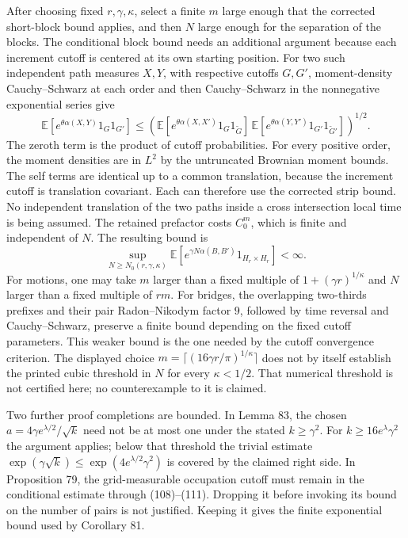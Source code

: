 \documentclass[10pt]{article}
\begin{document}
After choosing fixed \(r,\gamma,\kappa\), select a finite \(m\) large enough that the corrected short-block bound applies, and then \(N\) large enough for the separation of the blocks. The conditional block bound needs an additional argument because each increment cutoff is centered at its own starting position. For two such independent path measures \(X,Y\), with respective cutoffs \(G,G'\), moment-density Cauchy–Schwarz at each order and then Cauchy–Schwarz in the nonnegative exponential series give \[\mathbb E[e^{\theta\alpha(X,Y)}1_G1_{G'}]
 \le\left(
 \mathbb E[e^{\theta\alpha(X,X')}1_G1_{\widetilde G}]\,
 \mathbb E[e^{\theta\alpha(Y,Y')}1_{G'}1_{\widetilde G'}]
 \right)^{1/2}.\] The zeroth term is the product of cutoff probabilities. For every positive order, the moment densities are in \(L^2\) by the untruncated Brownian moment bounds. The self terms are identical up to a common translation, because the increment cutoff is translation covariant. Each can therefore use the corrected strip bound. No independent translation of the two paths inside a cross intersection local time is being assumed. The retained prefactor costs \(C_0^m\), which is finite and independent of \(N\). The resulting bound is \[\sup_{N\ge N_0(r,\gamma,\kappa)}
 \mathbb E[e^{\gamma N\alpha(B,B')}1_{H_r\times H_r}]
 <\infty .\] For motions, one may take \(m\) larger than a fixed multiple of \(1+(\gamma r)^{1/\kappa}\) and \(N\) larger than a fixed multiple of \(rm\). For bridges, the overlapping two-thirds prefixes and their pair Radon–Nikodym factor \(9\), followed by time reversal and Cauchy–Schwarz, preserve a finite bound depending on the fixed cutoff parameters. This weaker bound is the one needed by the cutoff convergence criterion. The displayed choice \(m=\lceil(16\gamma r/\pi)^{1/\kappa}\rceil\) does not by itself establish the printed cubic threshold in \(N\) for every \(\kappa<1/2\). That numerical threshold is not certified here; no counterexample to it is claimed.\par
Two further proof completions are bounded. In Lemma 83, the chosen \(a=4\gamma e^{\lambda/2}/\sqrt{k}\) need not be at most one under the stated \(k\ge\gamma^2\). For \(k\ge16e^\lambda\gamma^2\) the argument applies; below that threshold the trivial estimate \(\exp(\gamma\sqrt{k})\le\exp(4e^{\lambda/2}\gamma^2)\) is covered by the claimed right side. In Proposition 79, the grid-measurable occupation cutoff must remain in the conditional estimate through (108)–(111). Dropping it before invoking its bound on the number of pairs is not justified. Keeping it gives the finite exponential bound used by Corollary 81.\par
\end{document}
